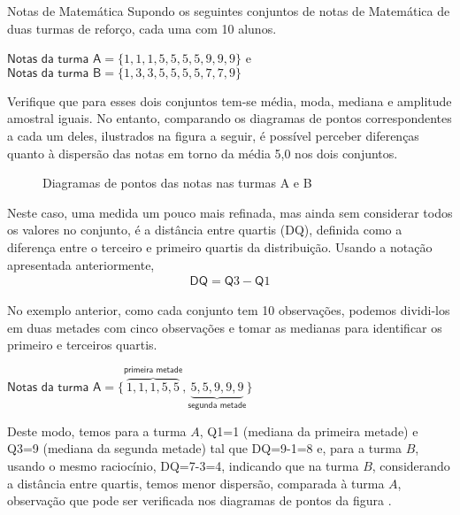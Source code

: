 \begin{example}{Notas de Matemática}
Supondo os seguintes conjuntos de notas de Matemática de duas turmas de reforço, cada uma com 10 alunos.

\(\textsf{Notas da turma A}=\{ 1,1,1,5,5,5,5,9,9,9\}\) e \(\textsf{Notas da turma B}=\{1,3,3,5,5,5,5,7,7,9\}\)

Verifique que para esses dois conjuntos tem-se média, moda, mediana e amplitude amostral iguais. No entanto, comparando os diagramas de pontos correspondentes a cada um deles, ilustrados na figura a seguir, é possível perceber diferenças quanto à dispersão das notas em torno da média 5,0 nos dois conjuntos.

\begin{figure}[H]
\centering
\capstart

\noindent{}
\caption{Diagramas de pontos das notas nas turmas A e B}\label{\detokenize{PE104-4:fig-diagrama-de-pontos-notas}}\label{\detokenize{PE104-4:id2}}\end{figure}


Neste caso, uma medida um pouco mais refinada, mas ainda sem considerar todos os valores no conjunto, é a distância entre quartis (DQ), definida como a diferença entre o terceiro e primeiro quartis da distribuição. Usando a notação apresentada anteriormente,
\begin{equation*}
\begin{split}\textsf{DQ}=\textsf{Q}3-\textsf{Q}1\end{split}
\end{equation*}
\end{example}

No exemplo anterior, como cada conjunto tem 10 observações, podemos dividi-los em duas metades com cinco observações e tomar as medianas para identificar os primeiro e terceiros quartis.

\(\textsf{Notas da turma A}= \{ \overbrace{1,1,1,5,5}^{\textsf{primeira metade}},\underbrace{5,5,9,9,9}_{\textsf{segunda metade}}\}\)

Deste modo, temos para a turma \(A\), Q1=1 (mediana da primeira metade) e Q3=9 (mediana da segunda metade) tal que DQ=9-1=8 e, para a turma \(B\), usando o mesmo raciocínio, DQ=7-3=4, indicando que na turma \(B\), considerando a distância entre quartis, temos menor dispersão, comparada à turma \(A\), observação que pode ser verificada nos diagramas de pontos da figura {\hyperref[\detokenize{PE104-4:fig-diagrama-de-pontos-notas}]{}}.

